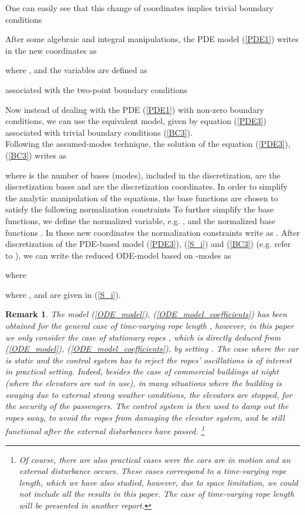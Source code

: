 \documentclass[letterpaper, 11 pt, conference]{ieeeconf}
\newtheorem{remark}{Remark}
\begin{document}
One can easily see that this change of coordinates implies trivial
boundary conditions

After some algebraic and integral manipulations, the PDE model
(\ref{PDE1}) writes in the new coordinates as

where ,
and the  variables are defined as


 associated with the two-point boundary conditions

Now instead of dealing with the PDE (\ref{PDE1}) with non-zero
boundary conditions, we can use the equivalent model, given by
equation (\ref{PDE3}) associated
with trivial boundary conditions (\ref{BC3}).\\
 Following the assumed-modes technique, the solution of the equation
 (\ref{PDE3}), (\ref{BC3}) writes as
 
 where  is the number of bases (modes), included in the
 discretization,  are the discretization
 bases and  are the discretization
 coordinates. In order to simplify the analytic manipulation of
 the equations, the base functions are chosen to satisfy the
 following normalization constraints
 \small
 To further simplify the base functions, we define the normalized
 variable, e.g. \cite{ZC06,ZX03}
,
and the normalized base functions
.
In these new coordinates the normalization constraints write as
.
After discretization of the PDE-based model (\ref{PDE3}),
(\ref{S_i}) and (\ref{BC3}) (e.g. refer to \cite{ZX03}), we can
write the reduced ODE-model based on -modes as

where

where , and  are given in
(\ref{S_i}).
\begin{remark}
The model (\ref{ODE_model}), (\ref{ODE_model_coefficients}) has
been obtained for the general case of time-varying rope length
, however, in this paper we only consider the case of
stationary ropes , which is directly deduced from
(\ref{ODE_model}), (\ref{ODE_model_coefficients}), by setting
. The case where the car is static
and the control system has to reject the ropes' oscillations is of
interest in practical setting. Indeed, besides the case of
commercial buildings at night (where the elevators are not in
use), in many situations where the building is swaying due to
external strong weather conditions, the elevators are stopped, for
the security of the passengers. The control system is then used to
damp out the ropes sway, to avoid the ropes from damaging the
elevator system, and be still functional after the external
disturbances have passed. \footnote{ Of course, there are also
practical cases were the cars are in motion and an external
disturbance occurs. These cases correspond to a time-varying rope
length, which we have also studied, however, due to space
limitation, we could not include all the results in this paper.
The case of time-varying rope length will be presented in another
report.}
\end{remark}
\end{document}
